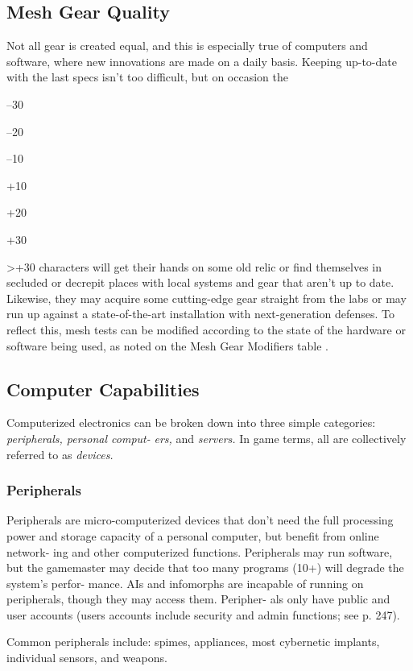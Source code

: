 \subsection{Mesh Gear Quality}

Not all gear is created equal, and this is especially true 
of computers and software, where new innovations 
are made on a daily basis. Keeping up-to-date with 
the last specs isn't too difficult, but on occasion the 

–30

–20

–10

+10

+20

+30

>+30
characters will get their hands on some old relic or 
find themselves in secluded or decrepit places with 
local systems and gear that aren't up to date. Likewise, 
they may acquire some cutting-edge gear straight 
from the labs or may run up against a state-of-the-art 
installation with next-generation defenses. To reflect 
this, mesh tests can be modified according to the state 
of the hardware or software being used, as noted on 
the Mesh Gear Modifiers table
.

\subsection{Computer Capabilities}

Computerized electronics can be broken down into 
three simple categories: \textit{peripherals, personal comput-}
\textit{ers,  }and  \textit{servers.} In game terms, all are collectively 
referred to as \textit{devices.}

\subsubsection{Peripherals}

Peripherals are micro-computerized devices that don't 
need the full processing power and storage capacity of 
a personal computer, but benefit from online network-
ing and other computerized functions. Peripherals may 
run software, but the gamemaster may decide that too 
many programs (10+) will degrade the system's perfor-
mance. AIs and infomorphs are incapable of running 
on peripherals, though they may access them. Peripher-
als only have public and user accounts (users accounts 
include security and admin functions; see p. 247).

Common peripherals include: spimes, appliances, most 
cybernetic implants, individual sensors, and weapons.

